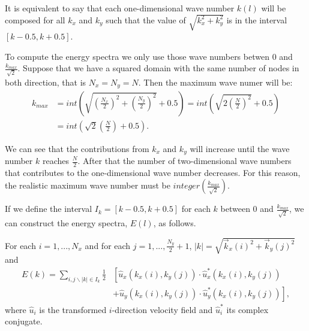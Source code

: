 \begin{itemize}
It is equivalent to say that each one-dimensional wave number $k(l)$ will be composed for all $k_x$ and $k_y$ such that the value of $\sqrt{k_x^2+k_y^2}$ is in the interval $[k-0.5,k+0.5]$.

To compute the energy spectra we only use those wave numbers betwen $0$ and $\frac{k_{max}}{\sqrt{2}}$. Suppose that we have a squared domain with the same number of nodes in both direction, that is $N_x=N_y=N$. Then the maximum wave numer will be:
\begin{align*}
\label{1.12.7}
k_{max}&=int\left(\sqrt{\left(\frac{N_x}{2}\right)^2+\left(\frac{N_y}{2}\right)^2}+0.5\right)=int\left(\sqrt{2\left(\frac{N}{2}\right)^2}+0.5\right)\\
&=int\left(\sqrt{2}\left(\frac{N}{2}\right)+0.5\right).
\end{align*}

We can see that the contributions from $k_x$ and $k_y$ will increase until the wave number $k$ reaches $\frac{N}{2}$. After that the number of two-dimensional wave numbers that contributes to the one-dimensional wave number decreases. For this reason, the realistic maximum wave number must be $integer\left(\frac{k_{max}}{\sqrt{2}}\right)$.

If we define the interval $I_k=[k-0.5,k+0.5]$ for each $k$ between $0$ and $\frac{k_{max}}{\sqrt{2}}$, we can construct the energy spectra, $E(l)$, as follows.

For each $i=1,...,N_x$ and for each $j=1,...,\frac{N_y}{2}+1$, $|k|=\sqrt{\vec{k}_x(i)^2+\vec{k}_y(j)^2}$ and 
\begin{align*}
E(k)=\sum_{i,j\backslash|k|\in I_k}\frac{1}{2}&\left[\hat{u}_x(k_x(i),k_y(j))\cdot\hat{u}_x^*(k_x(i),k_y(j))\right.\\
&\left.+\hat{u}_y(k_x(i),k_y(j))\cdot\hat{u}_y^*(k_x(i),k_y(j))\right],
\end{align*}
where $\hat{u}_i$ is the transformed $i$-direction velocity field and $\hat{u}_i^*$ its complex conjugate.

\end{itemize}

